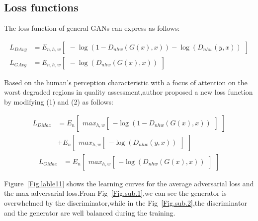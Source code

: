 \documentclass[10pt,twocolumn,letterpaper]{article}
\begin{document}
\subsection{Loss functions}
The loss function of general GANs can express as follows:
\begin{small}
\begin{align}
L_{D\!Avg} \!&=\! E_{n\!,\!h\!,\!w}\begin{bmatrix}
\!-\!\log(1\!-\!D_{nhw}(G(x)\!,\!x))\!-\!\log(D_{nhw}(y\!,\!x))
\end{bmatrix}\\
L_{G\!Avg}\!&=\! E_{n,h,w}\begin{bmatrix}
\!-\!\log(D_{nhw}(G(x),x))
\end{bmatrix}
\end{align}
\end{small}\par
Based on the human’s perception characteristic with a focus of attention on the worst degraded regions in quality assessment,author proposed a new
loss function by modifying (1) and (2) as follows:
\begin{small}
\begin{equation}
\begin{aligned}
L_{DMax}&=E_{n}\begin{bmatrix}
max_{h,w}\begin{bmatrix}
-\log(1-D_{nhw}(G(x),x))
\end{bmatrix}
\end{bmatrix}\\&+E_{n}\begin{bmatrix}
max_{h,w}\begin{bmatrix}
-\log(D_{nhw}(y,x))
\end{bmatrix}
\end{bmatrix}
\end{aligned}
\end{equation}
\begin{equation}
\begin{aligned}
L_{GMax}&=E_{n}\begin{bmatrix}
max_{h,w}\begin{bmatrix}
-\log(D_{nhw}(G(x),x))
\end{bmatrix}
\end{bmatrix}
\end{aligned}
\end{equation}
\end{small}\par
Figure~\ref{Fig.lable11} shows the learning curves for the average
adversarial loss and the max adversarial loss.From Fig~\ref{Fig.sub.1},we can see the generator is overwhelmed by the discriminator,while in the Fig~\ref{Fig.sub.2},the discriminator and the generator are well balanced during the training.
\begin{figure*}
\centering
{}
\caption{Average adversarial loss versus max adversarial
loss during the training}
\label{Fig.lable11}
\end{figure*}
\end{document}
